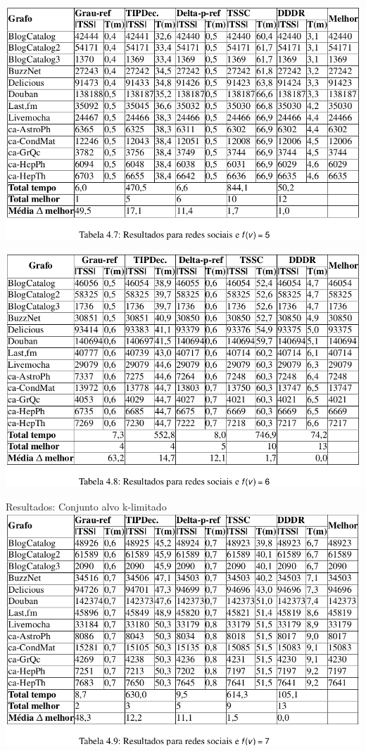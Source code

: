 \documentclass{beamer}
\begin{document}
\begin{frame}
\includegraphics[scale=0.3]{img/k5.png} 
\end{frame}

\begin{frame}
\includegraphics[scale=0.3]{img/k6.png}
\end{frame}

\begin{frame}{Resultados: Conjunto alvo k-limitado}
\includegraphics[scale=0.3]{img/k7.png}
\end{frame}
\end{document}
